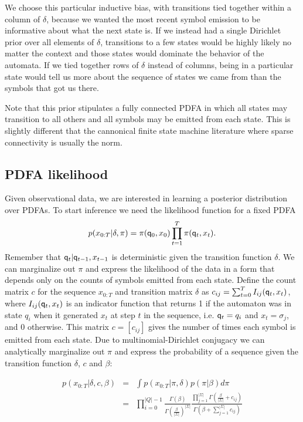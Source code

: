 %
We choose this particular inductive bias, with transitions tied together within a column of $\delta$, because we wanted the most recent symbol emission to be informative about what the next state is.  If we instead had a single Dirichlet prior over all elements of $\delta$, transitions to a few states would be highly likely no matter the context and those states would dominate the behavior of the automata.  If we tied together rows of $\delta$ instead of columns, being in a particular state would tell us more about the sequence of states we came from than the symbols that got us there.  

 Note that this prior stipulates a fully connected PDFA in which all states may transition to all others and all symbols may be emitted from each state.  This is slightly different that the cannonical finite state machine literature where sparse connectivity is usually the norm.

\subsection{PDFA likelihood}

Given observational data, we are interested in learning a posterior distribution over PDFAs.  To start inference we need the likelihood function for a fixed PDFA
%
\[ p(x_{0:T}|\delta,\pi) = \pi(\q_0,x_0)\prod_{t=1}^T \pi(\q_t,x_t) \label{x:def}. \]
%
Remember that $\q_t | \q_{t-1}, x_{t-1}$ is deterministic given the transition function $\delta$. 
We can marginalize out $\pi$ and express the likelihood of the data in a form that depends only on the counts of symbols emitted from each state.  Define the count matrix $c$ for the sequence $x_{0:T}$ and transition matrix $\delta$ as $c_{ij} = \sum_{t=0}^T I_{ij}(\q_t,x_t)$, where $I_{ij}(\q_t,x_t)$ is an indicator function that returns 1 if the automaton was in state $q_i$ when it generated $x_t$ at step $t$ in the sequence, i.e. $\q_t = q_i$ and $x_t = \sigma_j$, and 0 otherwise. This matrix $c = [c_{ij}]$ gives the number of times each symbol is emitted from each state.  Due to multinomial-Dirichlet conjugacy we can analytically marginalize out $\pi$ and express the probability of a sequence given the transition function $\delta$, $c$ and $\beta$:

\begin{eqnarray}
 p(x_{0:T}|\delta,c,\beta) & = & \int p(x_{0:T}|\pi,\delta) p(\pi|\beta) d\pi \label{x:factor} \nonumber \\
 & = & \prod_{i=0}^{|Q|-1} \frac{\Gamma(\beta)}{\Gamma(\frac{\beta}{|\Sigma|})^{|\Sigma|}} \frac{\prod_{j=1}^{|\Sigma|}\Gamma(\frac{\beta}{|\Sigma|} + c_{ij})}{\Gamma(\beta + \sum_{j=1}^{|\Sigma|} c_{ij})} \label{x:end}
 \end{eqnarray}
 

